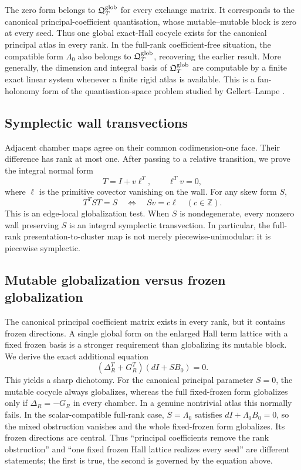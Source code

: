 The zero form belongs to $\mathfrak Q^{\mathrm{glob}}_T$ for every exchange matrix.  It corresponds
to the canonical principal-coefficient quantisation, whose mutable--mutable
block is zero at every seed.  Thus one global exact-Hall cocycle exists for
the canonical principal atlas in every rank.  In the full-rank
coefficient-free situation, the compatible form $\Lambda_0$ also belongs to
$\mathfrak Q^{\mathrm{glob}}_T$, recovering the earlier result.  More generally, the dimension and
integral basis of $\mathfrak Q^{\mathrm{glob}}_T$ are computable by a finite exact linear system
whenever a finite rigid atlas is available.  This is a fan-holonomy form of
the quantisation-space problem studied by Gellert--Lampe
\cite{GellertLampe}.

\subsection*{Symplectic wall transvections}

Adjacent chamber maps agree on their common codimension-one face.  Their
difference has rank at most one.  After passing to a relative transition, we
prove the integral normal form
\[
 T=I+v\ell^T,
 \qquad \ell^Tv=0,
\]
where $\ell$ is the primitive covector vanishing on the wall.  For any skew
form $S$,
\[
 T^TST=S
 \quad\Longleftrightarrow\quad
 Sv=c\ell
 \quad(c\in\mathbb Z).
\]
This is an edge-local globalization test.  When $S$ is nondegenerate, every
nonzero wall preserving $S$ is an integral symplectic transvection.  In
particular, the full-rank presentation-to-cluster map is not merely
piecewise-unimodular: it is piecewise symplectic.

\subsection*{Mutable globalization versus frozen globalization}

The canonical principal coefficient matrix exists in every rank, but it
contains frozen directions.  A single global form on the enlarged Hall term
lattice with a fixed frozen basis is a stronger requirement than globalizing
its mutable block.  We derive the exact additional equation
\[
 (\Delta_R^T+G_R^T)(dI+SB_0)=0.
\]
This yields a sharp dichotomy.  For the canonical principal parameter $S=0$,
the mutable cocycle always globalizes, whereas the full fixed-frozen form
globalizes only if $\Delta_R=-G_R$ in every chamber.  In a genuine nontrivial
atlas this normally fails.  In the scalar-compatible full-rank case,
$S=\Lambda_0$ satisfies $dI+\Lambda_0B_0=0$, so the mixed obstruction
vanishes and the whole fixed-frozen form globalizes.  Its frozen directions
are central.  Thus ``principal coefficients remove the rank obstruction'' and
``one fixed frozen Hall lattice realizes every seed'' are different
statements; the first is true, the second is governed by the equation above.

